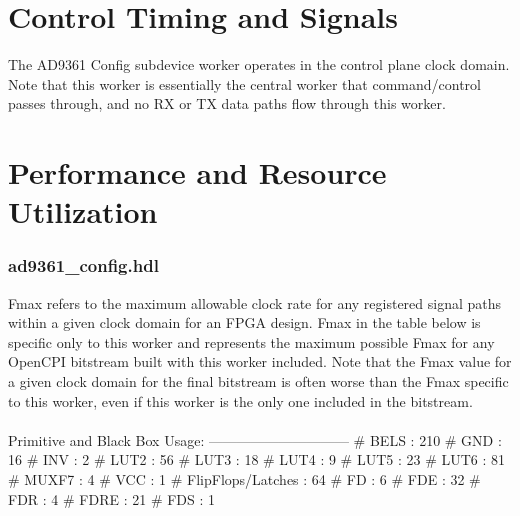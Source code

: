 \documentclass{article}
\def\comp{ad9361\_config}
\def\Comp{AD9361 Config}
\begin{document}
\section*{Control Timing and Signals}
The \Comp{} subdevice worker operates in the control plane clock domain. Note that this worker is essentially the central worker that command/control passes through, and no RX or TX data paths flow through this worker.

\section*{Performance and Resource Utilization}
\subsubsection*{\comp.hdl}
Fmax refers to the maximum allowable clock rate for any registered signal paths within a given clock domain for an FPGA design. Fmax in the table below is specific only to this worker and represents the maximum possible Fmax for any OpenCPI bitstream built with this worker included. Note that the Fmax value for a given clock domain for the final bitstream is often worse than the Fmax specific to this worker, even if this worker is the only one included in the bitstream. \\ \\
\iffalse
Partition Merge Status : Successful - Tue Aug  1 18:31:58 2017
Quartus Prime Version : 15.1.0 Build 185 10/21/2015 SJ Standard Edition
Revision Name : ad9361_config_rv
Top-level Entity Name : ad9361_config_rv
Family : Stratix IV
Logic utilization : N/A
    Combinational ALUTs : 167
    Memory ALUTs : 0
    Dedicated logic registers : 70
Total registers : 70
Total pins : 216
Total virtual pins : 0
Total block memory bits : 0
DSP block 18-bit elements : 0
Total GXB Receiver Channel PCS : 0
Total GXB Receiver Channel PMA : 0
Total GXB Transmitter Channel PCS : 0
Total GXB Transmitter Channel PMA : 0
Total PLLs : 0
Total DLLs : 0
\fi
\iffalse
Primitive and Black Box Usage:
------------------------------
# BELS                             : 210
#      GND                         : 16
#      INV                         : 2
#      LUT2                        : 56
#      LUT3                        : 18
#      LUT4                        : 9
#      LUT5                        : 23
#      LUT6                        : 81
#      MUXF7                       : 4
#      VCC                         : 1
# FlipFlops/Latches                : 64
#      FD                          : 6
#      FDE                         : 32
#      FDR                         : 4
#      FDRE                        : 21
#      FDS                         : 1
\end{document}
